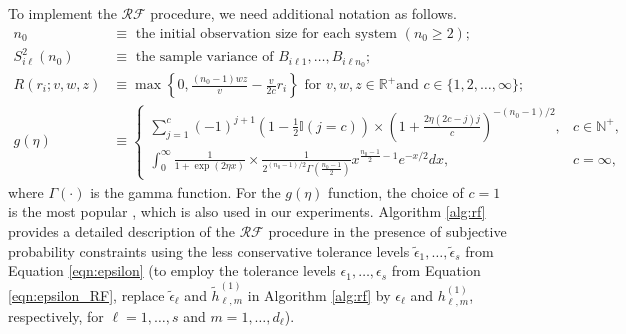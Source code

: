 \documentclass[11pt]{article}
\begin{document}
To implement the $\mathcal{RF}$ procedure, we need additional notation as follows.
\begin{align}
n_0 &\equiv \text { the initial observation size for each system } \left(n_0 \geq 2\right); \nonumber \\
S_{i \ell}^2\left(n_0\right) &\equiv \text { the sample variance of } {B}_{i \ell 1}, \ldots, {B}_{i \ell n_0}; \nonumber \\
R\left(r_i ; v, w, z\right) &\equiv \max \left\{0, \frac{\left(n_0-1\right) w z}{v}-\frac{v}{2 c} r_i\right\} \text { for } v, w, z \in \mathbb{R}^{+} \text {and } c \in\{1,2, \ldots, \infty\};  \nonumber \\
g(\eta) &\equiv 
\begin{cases}
    \sum_{j=1}^c(-1)^{j+1}\left(1-\frac{1}{2} \mathbb{I}(j=c)\right) \times\left(1+\frac{2 \eta(2 c-j) j}{c}\right)^{-\left(n_0-1\right) / 2}, & c \in \mathbb{N}^{+},  \\
    \int_0^{\infty} \frac{1}{1+\exp (2 \eta x)} \times \frac{1}{2^{\left(n_0-1\right) / 2} \Gamma\left(\frac{n_0-1}{2}\right)} x^{\frac{n_0-1}{2} -1} e^{-x / 2} dx, & c=\infty, \label{eqn:beta_rf}
\end{cases}  \nonumber
\end{align}
where $\Gamma(\cdot)$ is the gamma function. For the $g(\eta)$ function, the choice of $c=1$ is the most popular \citep{zhou2022finding}, which is also used in our experiments. Algorithm \ref{alg:rf} provides a detailed description of the $\mathcal{RF}$ procedure in the presence of subjective probability constraints using the less conservative tolerance levels $\tilde{\epsilon}_1, \ldots, \tilde{\epsilon}_s$ from Equation \eqref{eqn:epsilon} (to employ the tolerance levels $\epsilon_1, \ldots, \epsilon_s$ from Equation \eqref{eqn:epsilon_RF}, replace $\tilde{\epsilon}_\ell$ and $\tilde{h}_{\ell,m}^{(1)}$ in Algorithm \ref{alg:rf} by $\epsilon_\ell$ and $h_{\ell,m}^{(1)}$, respectively, for $\ell=1,\ldots,s$ and $m=1,\ldots,d_\ell$).  
\end{document}

